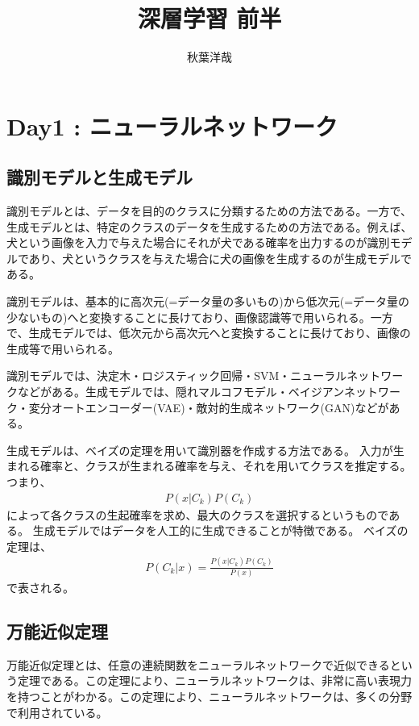 \documentclass{ltjsarticle}
\begin{document}
\title{深層学習 前半}
\author{秋葉洋哉}
\maketitle

\section{Day1 : ニューラルネットワーク}
\subsection{識別モデルと生成モデル}
識別モデルとは、データを目的のクラスに分類するための方法である。一方で、生成モデルとは、特定のクラスのデータを生成するための方法である。例えば、犬という画像を入力で与えた場合にそれが犬である確率を出力するのが識別モデルであり、犬というクラスを与えた場合に犬の画像を生成するのが生成モデルである。
\par
識別モデルは、基本的に高次元(=データ量の多いもの)から低次元(=データ量の少ないもの)へと変換することに長けており、画像認識等で用いられる。一方で、生成モデルでは、低次元から高次元へと変換することに長けており、画像の生成等で用いられる。
\par
識別モデルでは、決定木・ロジスティック回帰・SVM・ニューラルネットワークなどがある。生成モデルでは、隠れマルコフモデル・ベイジアンネットワーク・変分オートエンコーダー(VAE)・敵対的生成ネットワーク(GAN)などがある。
\par
生成モデルは、ベイズの定理を用いて識別器を作成する方法である。
入力が生まれる確率と、クラスが生まれる確率を与え、それを用いてクラスを推定する。つまり、
\begin{align}
  P(x|C_k)P(C_k)
\end{align}
によって各クラスの生起確率を求め、最大のクラスを選択するというものである。
生成モデルではデータを人工的に生成できることが特徴である。
ベイズの定理は、
\begin{align}
  P(C_k|x) = \frac{P(x|C_k)P(C_k)}{P(x)}
\end{align}
で表される。

\subsection{万能近似定理}
万能近似定理とは、任意の連続関数をニューラルネットワークで近似できるという定理である。この定理により、ニューラルネットワークは、非常に高い表現力を持つことがわかる。この定理により、ニューラルネットワークは、多くの分野で利用されている。
\end{document}

